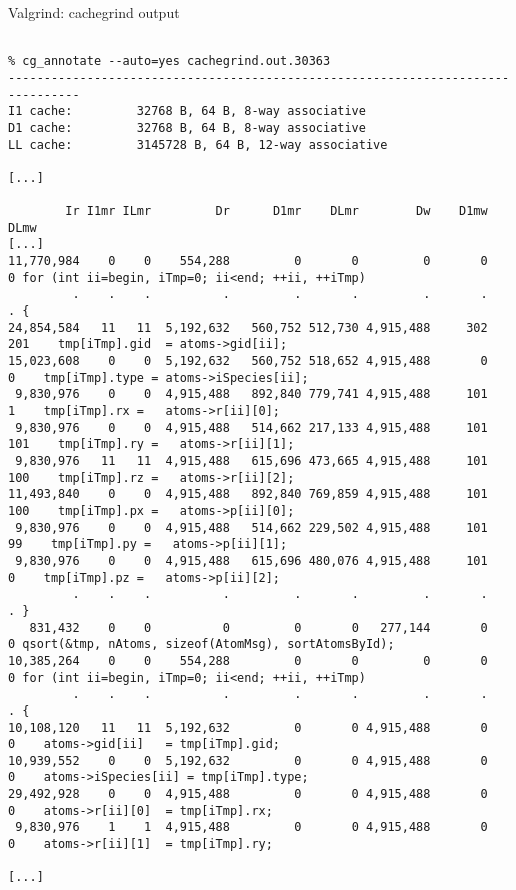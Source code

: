 \documentclass[10pt,xcolor=table]{beamer}
\begin{document}
\begin{frame}[fragile]{Valgrind: cachegrind output}

  \begin{lstlisting}[style=valgrind,xleftmargin=-0.75cm,basicstyle=\tiny\ttfamily,caption={Cachegrind
      output: annotated output}]

% cg_annotate --auto=yes cachegrind.out.30363
--------------------------------------------------------------------------------
I1 cache:         32768 B, 64 B, 8-way associative
D1 cache:         32768 B, 64 B, 8-way associative
LL cache:         3145728 B, 64 B, 12-way associative

[...]

        Ir I1mr ILmr         Dr      D1mr    DLmr        Dw    D1mw   DLmw
[...]
11,770,984    0    0    554,288         0       0         0       0      0 for (int ii=begin, iTmp=0; ii<end; ++ii, ++iTmp)
         .    .    .          .         .       .         .       .      . {
24,854,584   11   11  5,192,632   560,752 512,730 4,915,488     302    201    tmp[iTmp].gid  = atoms->gid[ii];
15,023,608    0    0  5,192,632   560,752 518,652 4,915,488       0      0    tmp[iTmp].type = atoms->iSpecies[ii];
 9,830,976    0    0  4,915,488   892,840 779,741 4,915,488     101      1    tmp[iTmp].rx =   atoms->r[ii][0];
 9,830,976    0    0  4,915,488   514,662 217,133 4,915,488     101    101    tmp[iTmp].ry =   atoms->r[ii][1];
 9,830,976   11   11  4,915,488   615,696 473,665 4,915,488     101    100    tmp[iTmp].rz =   atoms->r[ii][2];
11,493,840    0    0  4,915,488   892,840 769,859 4,915,488     101    100    tmp[iTmp].px =   atoms->p[ii][0];
 9,830,976    0    0  4,915,488   514,662 229,502 4,915,488     101     99    tmp[iTmp].py =   atoms->p[ii][1];
 9,830,976    0    0  4,915,488   615,696 480,076 4,915,488     101      0    tmp[iTmp].pz =   atoms->p[ii][2];
         .    .    .          .         .       .         .       .      . }
   831,432    0    0          0         0       0   277,144       0      0 qsort(&tmp, nAtoms, sizeof(AtomMsg), sortAtomsById);
10,385,264    0    0    554,288         0       0         0       0      0 for (int ii=begin, iTmp=0; ii<end; ++ii, ++iTmp)
         .    .    .          .         .       .         .       .      . {
10,108,120   11   11  5,192,632         0       0 4,915,488       0      0    atoms->gid[ii]   = tmp[iTmp].gid;
10,939,552    0    0  5,192,632         0       0 4,915,488       0      0    atoms->iSpecies[ii] = tmp[iTmp].type;
29,492,928    0    0  4,915,488         0       0 4,915,488       0      0    atoms->r[ii][0]  = tmp[iTmp].rx;
 9,830,976    1    1  4,915,488         0       0 4,915,488       0      0    atoms->r[ii][1]  = tmp[iTmp].ry;

[...]
\end{lstlisting}

\end{frame}
\end{document}
